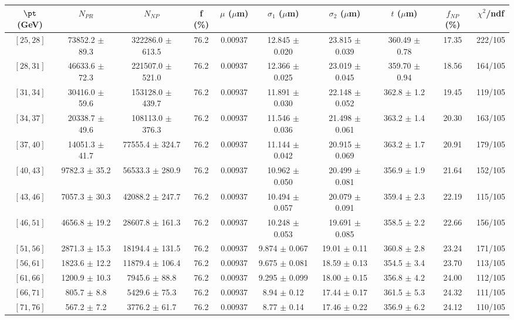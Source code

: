 \begin{tabular}{c||c|c|c|c|c|c|c||c|c}
$\pt$ (GeV) & $N_{PR}$ & $N_{NP}$ & f (\%) & $\mu$ ($\mu$m) & $\sigma_1$ ($\mu$m) & $\sigma_2$ ($\mu$m)  & $t$ ($\mu$m) & $f_{NP}$ (\%) & $\chi^2$/ndf \\
\hline
$[25, 28]$ & 73852.2 $\pm$ 89.3 & 322286.0 $\pm$ 613.5 & 76.2 & 0.00937 & 12.845 $\pm$ 0.020 & 23.815 $\pm$ 0.039 & 360.49 $\pm$ 0.78 & 17.35 & 222/105\\
$[28, 31]$ & 46633.6 $\pm$ 72.3 & 221507.0 $\pm$ 521.0 & 76.2 & 0.00937 & 12.366 $\pm$ 0.025 & 23.019 $\pm$ 0.045 & 359.70 $\pm$ 0.94 & 18.56 & 164/105\\
$[31, 34]$ & 30416.0 $\pm$ 59.6 & 153128.0 $\pm$ 439.7 & 76.2 & 0.00937 & 11.891 $\pm$ 0.030 & 22.148 $\pm$ 0.052 & 362.8 $\pm$ 1.2 & 19.45 & 119/105\\
$[34, 37]$ & 20338.7 $\pm$ 49.6 & 108113.0 $\pm$ 376.3 & 76.2 & 0.00937 & 11.546 $\pm$ 0.036 & 21.498 $\pm$ 0.061 & 363.2 $\pm$ 1.4 & 20.30 & 163/105\\
$[37, 40]$ & 14051.3 $\pm$ 41.7 & 77555.4 $\pm$ 324.7 & 76.2 & 0.00937 & 11.144 $\pm$ 0.042 & 20.915 $\pm$ 0.069 & 363.2 $\pm$ 1.7 & 20.91 & 179/105\\
$[40, 43]$ & 9782.3 $\pm$ 35.2 & 56533.3 $\pm$ 280.9 & 76.2 & 0.00937 & 10.962 $\pm$ 0.050 & 20.499 $\pm$ 0.081 & 356.9 $\pm$ 1.9 & 21.64 & 152/105\\
$[43, 46]$ & 7057.3 $\pm$ 30.3 & 42088.2 $\pm$ 247.7 & 76.2 & 0.00937 & 10.494 $\pm$ 0.057 & 20.079 $\pm$ 0.091 & 359.4 $\pm$ 2.3 & 22.19 & 115/105\\
$[46, 51]$ & 4656.8 $\pm$ 19.2 & 28607.8 $\pm$ 161.3 & 76.2 & 0.00937 & 10.248 $\pm$ 0.053 & 19.691 $\pm$ 0.085 & 358.5 $\pm$ 2.2 & 22.66 & 156/105\\
$[51, 56]$ & 2871.3 $\pm$ 15.3 & 18194.4 $\pm$ 131.5 & 76.2 & 0.00937 & 9.874 $\pm$ 0.067 & 19.01 $\pm$ 0.11 & 360.8 $\pm$ 2.8 & 23.24 & 171/105\\
$[56, 61]$ & 1823.6 $\pm$ 12.2 & 11879.4 $\pm$ 106.4 & 76.2 & 0.00937 & 9.675 $\pm$ 0.081 & 18.59 $\pm$ 0.13 & 354.5 $\pm$ 3.4 & 23.70 & 113/105\\
$[61, 66]$ & 1200.9 $\pm$ 10.3 & 7945.6 $\pm$ 88.8 & 76.2 & 0.00937 & 9.295 $\pm$ 0.099 & 18.00 $\pm$ 0.15 & 356.8 $\pm$ 4.2 & 24.00 & 112/105\\
$[66, 71]$ & 805.7 $\pm$ 8.8 & 5429.6 $\pm$ 75.3 & 76.2 & 0.00937 & 8.94 $\pm$ 0.12 & 17.44 $\pm$ 0.17 & 361.5 $\pm$ 5.3 & 24.32 & 111/105\\
$[71, 76]$ & 567.2 $\pm$ 7.2 & 3776.2 $\pm$ 61.7 & 76.2 & 0.00937 & 8.77 $\pm$ 0.14 & 17.46 $\pm$ 0.22 & 356.9 $\pm$ 6.2 & 24.12 & 110/105\\

\end{tabular}
